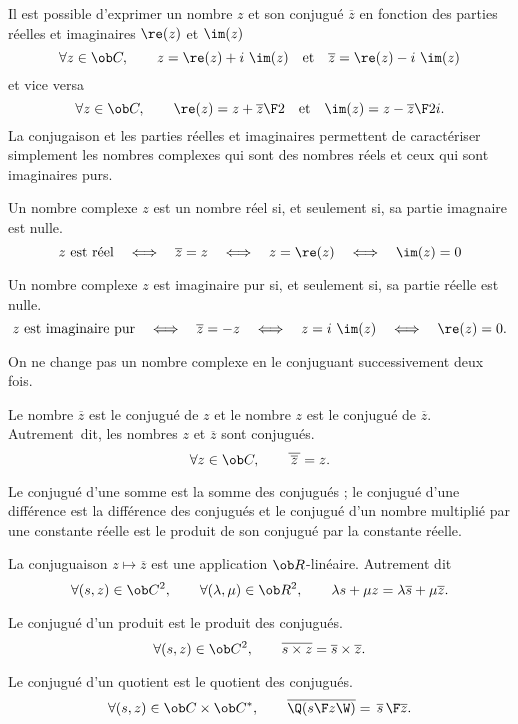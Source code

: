 \noindent
Il est possible d'exprimer un nombre $z$ et son conjugu\'e $\overline z$ en fonction des parties r\'eelles et imaginaires $\re(z)$ et $\im(z)$
$$
\forall z\in\ob C, \qquad z=\re(z)+i\ \im(z)\quad\mbox{et}\quad \overline z=\re(z)-i\ \im(z)
$$
et vice versa
$$
\forall z\in\ob C, \qquad \re(z)={z+\overline z\F 2}\quad\mbox{et}\quad\im(z)={z-\overline z\F2i}. 
$$
La conjugaison et les parties r\'eelles et imaginaires permettent de caract\'eriser 
simplement les nombres complexes qui sont des nombres r\'eels et ceux qui sont imaginaires purs. 
\medskip

\Propriete 
Un nombre complexe $z$ est un nombre r\'eel si, et seulement si, sa partie imagnaire est nulle. 
$$
z\mbox{ est r\'eel}\quad\Longleftrightarrow\quad \overline z=z\quad\Longleftrightarrow\quad z=\re(z)\quad\Longleftrightarrow\quad\im(z)=0
$$

\Propriete 
Un nombre complexe $z$ est imaginaire pur si, et seulement si, sa partie r\'eelle est nulle. 
$$
z\mbox{ est imaginaire pur}\quad\Longleftrightarrow\quad \overline z=-z\quad\Longleftrightarrow\quad z=i\ \im(z)\quad\Longleftrightarrow\quad\re(z)=0.
$$

On ne change pas un nombre complexe en le conjuguant successivement deux fois. 
\medskip

\Bullet Le nombre $\overline z$ est le conjugu\'e de $z$ et le nombre $z$ est le conjugu\'e de $\overline z$. Autrement~dit, les nombres $z$ et $\overline z$ sont conjugu\'es. 
$$
\forall z\in\ob C,\qquad \overline{\thinspace\overline z\thinspace}=z.
$$

Le conjugu\'e d'une somme est la somme des conjugu\'es ; le conjugu\'e d'une diff\'erence est la diff\'erence des conjugu\'es et 
le conjugu\'e d'un nombre multipli\'e par une constante r\'eelle est le produit de son conjugu\'e par la constante r\'eelle. 
\medskip

\Bullet
La conjuguaison $z\mapsto\overline z$ est une application $\ob R$-lin\'eaire. Autrement dit 
$$
\forall (s,z)\in\ob C^2,\qquad\forall(\lambda,\mu)\in\ob R^2, 
\qquad \lambda s+\mu z=\lambda\overline s+\mu\overline z.
$$


\Bullet Le conjugu\'e d'un produit est le produit des conjugu\'es. 
$$
\forall (s,z)\in\ob C^2, \qquad \overline{s\times z}=\overline s\times \overline z.
$$


\Bullet Le conjugu\'e d'un quotient est le quotient des conjugu\'es. 
$$
\forall (s,z)\in\ob C\times\ob C^*, \qquad 
\overline{\Q({s\F z}\W)}={\thinspace\overline s\thinspace\F \overline z}.
$$

